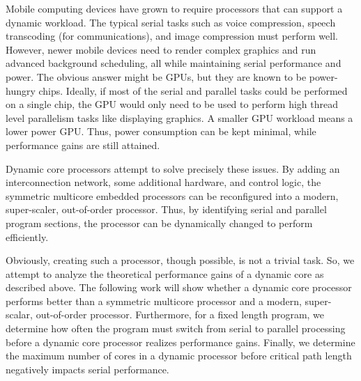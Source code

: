 Mobile computing devices have grown to require processors that can support a dynamic workload. The typical serial tasks such as voice compression, speech transcoding (for communications), and image compression must perform well. However, newer mobile devices need to render complex graphics and run advanced background scheduling, all while maintaining serial performance and power. The obvious answer might be GPUs, but they are known to be power-hungry chips. Ideally, if most of the serial and parallel tasks could be performed on a single chip, the GPU would only need to be used to perform high thread level parallelism tasks like displaying graphics. A smaller GPU workload means a lower power GPU. Thus, power consumption can be kept minimal, while performance gains are still attained.

Dynamic core processors attempt to solve precisely these issues. By adding an interconnection network, some additional hardware, and control logic, the symmetric multicore embedded processors can be reconfigured into a modern, super-scaler, out-of-order processor. Thus, by identifying serial and parallel program sections, the processor can be dynamically changed to perform efficiently.

Obviously, creating such a processor, though possible, is not a trivial task. So, we attempt to analyze the theoretical performance gains of a dynamic core as described above. The following work will show whether a dynamic core processor performs better than a symmetric multicore processor and a modern, super-scalar, out-of-order processor. Furthermore, for a fixed length program, we determine how often the program must switch from serial to parallel processing before a dynamic core processor realizes performance gains. Finally, we determine the maximum number of cores in a dynamic processor before critical path length negatively impacts serial performance.